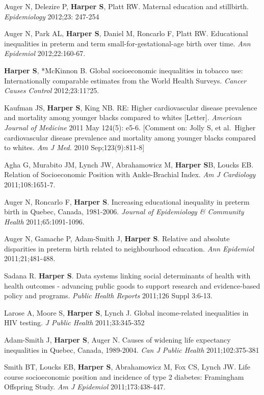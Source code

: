 \documentclass[
  letterpaper,
  DIV=11,
  numbers=noendperiod]{scrartcl}
\begin{document}
Auger N, Delezire P, \textbf{Harper S}, Platt RW. Maternal education and
stillbirth. \emph{Epidemiology} 2012;23: 247-254

Auger N, Park AL, \textbf{Harper S}, Daniel M, Roncarlo F, Platt RW.
Educational inequalities in preterm and term small-for-gestational-age
birth over time. \emph{Ann Epidemiol} 2012;22:160-67.

\textbf{Harper S}, *McKinnon B. Global socioeconomic inequalities in
tobacco use: Internationally comparable estimates from the World Health
Surveys. \emph{Cancer Causes Control} 2012;23:11?25.

Kaufman JS, \textbf{Harper S}, King NB. RE: Higher cardiovascular
disease prevalence and mortality among younger blacks compared to whites
{[}Letter{]}. \emph{American Journal of Medicine} 2011 May 124(5): e5-6.
{[}Comment on: Jolly S, et al.~Higher cardiovascular disease prevalence
and mortality among younger blacks compared to whites. \emph{Am J Med.}
2010 Sep;123(9):811-8{]}

Agha G, Murabito JM, Lynch JW, Abrahamowicz M, \textbf{Harper S}B,
Loucks EB. Relation of Socioeconomic Position with Ankle-Brachial Index.
\emph{Am J Cardiology} 2011;108:1651-7.

Auger N, Roncarlo F, \textbf{Harper S}. Increasing educational
inequality in preterm birth in Quebec, Canada, 1981-2006. \emph{Journal
of Epidemiology \& Community Health} 2011;65:1091-1096.

Auger N, Gamache P, Adam-Smith J, \textbf{Harper S}. Relative and
absolute disparities in preterm birth related to neighbourhood
education. \emph{Ann Epidemiol} 2011;21;481-488.

Sadana R. \textbf{Harper S}. Data systems linking social determinants of
health with health outcomes - advancing public goods to support research
and evidence-based policy and programs. \emph{Public Health Reports}
2011;126 Suppl 3:6-13.

Larose A, Moore S, \textbf{Harper S}, Lynch J. Global income-related
inequalities in HIV testing. \emph{J Public Health} 2011;33:345-352

Adam-Smith J, \textbf{Harper S}, Auger N. Causes of widening life
expectancy inequalities in Quebec, Canada, 1989-2004. \emph{Can J Public
Health} 2011;102:375-381

Smith BT, Loucks EB, \textbf{Harper S}, Abrahamowicz M, Fox CS, Lynch
JW. Life course socioeconomic position and incidence of type 2 diabetes:
Framingham Offspring Study. \emph{Am J Epidemiol} 2011;173:438-447.
\end{document}
